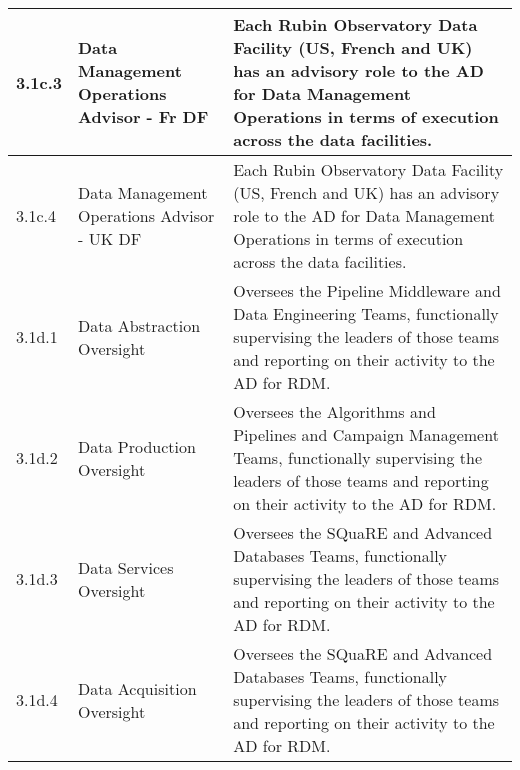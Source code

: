 \begin{longtable} {|p{}|p{}|p{}|}
{3.1c.3}&{Data Management Operations Advisor - Fr DF}&{Each Rubin Observatory Data Facility (US, French and UK) has an advisory role to the AD for Data Management Operations in terms of execution across the data facilities.  } \\ \hline
{3.1c.4}&{Data Management Operations Advisor - UK DF}&{Each Rubin Observatory Data Facility (US, French and UK) has an advisory role to the AD for Data Management Operations in terms of execution across the data facilities.  } \\ \hline
{3.1d.1}&{Data Abstraction Oversight}&{Oversees the Pipeline Middleware and Data Engineering Teams, functionally supervising the leaders of those teams and reporting on their activity to the AD for RDM. } \\ \hline
{3.1d.2}&{Data Production Oversight}&{Oversees the Algorithms and Pipelines and Campaign Management Teams, functionally supervising the leaders of those teams and reporting on their activity to the AD for RDM. } \\ \hline
{3.1d.3}&{Data Services Oversight}&{Oversees the SQuaRE and Advanced Databases Teams, functionally supervising the leaders of those teams and reporting on their activity to the AD for RDM. } \\ \hline
{3.1d.4}&{Data Acquisition Oversight}&{Oversees the SQuaRE and Advanced Databases Teams, functionally supervising the leaders of those teams and reporting on their activity to the AD for RDM. } \\ \hline
\end{longtable} \normalsize
